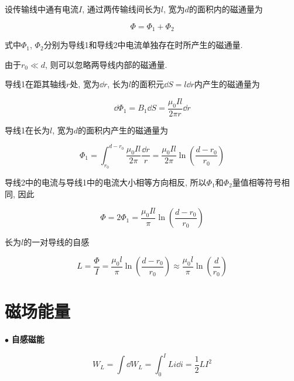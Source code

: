 \begin{example}
	\begin{solution}
		
		设传输线中通有电流$I$, 通过两传输线间长为$l$, 宽为$d$的面积内的磁通量为
		
		\begin{equation*}
			\varPhi = \varPhi_1 + \varPhi_2
		\end{equation*}
		
		式中$\varPhi_1$, $\varPhi_2$分别为导线1和导线2中电流单独存在时所产生的磁通量. 
		
		由于$r_0 \ll d$, 则可以忽略两导线内部的磁通量. 
		
		导线1在距其轴线$r$处, 宽为$\dd{r}$, 长为$l$的面积元$\dd{S} = l \dd{r}$内产生的磁通量为
		
		\begin{equation*}
			\dd{\varPhi_1} = B_1 \dd{S} = \dfrac{\mu_0 I l}{2 \pi r} \dd{r}
		\end{equation*}
		
		导线1在长为$l$, 宽为$d$的面积内产生的磁通量为
		
		\begin{equation*}
			\varPhi_1 = \int_{r_0}^{d - r_0} \dfrac{\mu_0 I l}{2 \pi} \dfrac{\dd{r}}{r} = \dfrac{\mu_0 I l}{2 \pi} \ln(\dfrac{d-r_0}{r_0})
		\end{equation*}
		
		导线2中的电流与导线1中的电流大小相等方向相反, 所以$\varPhi_1$和$\varPhi_2$量值相等符号相同, 因此
		
		\begin{equation*}
			\varPhi = 2 \varPhi_1 = \dfrac{\mu_0 I l}{\pi} \ln(\dfrac{d-r_0}{r_0})
		\end{equation*}
		
		长为$l$的一对导线的自感
		
		\begin{equation*}
			L = \dfrac{\varPhi}{I} = \dfrac{\mu_0 l}{\pi} \ln(\dfrac{d-r_0}{r_0}) \approx \dfrac{\mu_0 l}{\pi} \ln(\dfrac{d}{r_0})
		\end{equation*}
		
	\end{solution}
	
\end{example}

\section{磁场能量}\label{9.4}

$\bullet$ \textbf{自感磁能}

\begin{equation}
	W_L = \int \dd{W_L} = \int_{0}^{I} L i \dd{i} = \dfrac{1}{2} L I^2 \label{C9-eq18}
\end{equation}

